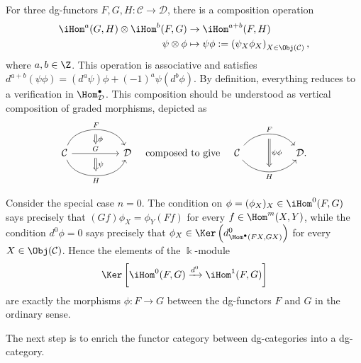 For three dg-functors $F,G,H:\mathcal{C}\to\mathcal{D}$, there is a
composition operation
\begin{equation}\label{eqn:dgfct-iHom}\begin{aligned}
	\iHom^a(G, H) \otimes \iHom^b(F, G) & \to \iHom^{a+b}(F, H) \\
	\psi \otimes \phi & \mapsto \psi\phi := \left( \psi_X \phi_X \right)_{X \in \Obj(\mathcal{C})},
\end{aligned}\end{equation}
where $a,b\in\Z$. This operation is associative and satisfies
$d^{a+b}(\psi\phi)=(d^a\psi)\phi+(-1)^a\psi(d^b\phi)$. By definition,
everything reduces to a verification in $\Hom^\bullet_{\mathcal{D}}$. This
composition should be understood as vertical composition of graded
morphisms, depicted as
\[\begin{tikzcd}
	\mathcal{C}
	\arrow[bend left=70, rr, "F", ""' name=U]
	\arrow[rr, "G" name=MM, ""' name=M]
	\arrow[bend right=70, rr, "" name=D, "H"'] & &
	\arrow[Rightarrow, to path=(U) -- (MM) \tikztonodes, "\phi"] \arrow[Rightarrow, to path=(M) -- (D) \tikztonodes, "\psi"] \mathcal{D}
\end{tikzcd}  \quad \text{composed to give} \quad \begin{tikzcd}
	\mathcal{C}
	\arrow[bend left=50, rr, "F", ""' name=U]
	\arrow[bend right=50, rr, "" name=D, "H"']
	& & \arrow[Rightarrow, to path=(U) -- (D) \tikztonodes, "\psi \phi"] \mathcal{D} .
\end{tikzcd}\]

Consider the special case $n=0$. The condition on
$\phi=(\phi_X)_X\in\iHom^0(F,G)$ says precisely that
$(Gf)\phi_X=\phi_Y(Ff)$ for every $f\in\Hom^m(X,Y)$, while the condition
$d^0\phi=0$ says precisely that
$\phi_X\in\Ker\left(d^0_{\Hom^\bullet(FX,GX)}\right)$ for every
$X\in\Obj(\mathcal{C})$. Hence the elements of the $\Bbbk$-module
\[ \Ker\left[ \iHom^0(F, G) \xrightarrow{d^0} \iHom^1(F, G) \right] \]
are exactly the morphisms $\phi:F\to G$ between the dg-functors $F$ and $G$
in the ordinary sense.

The next step is to enrich the functor category between dg-categories into a
dg-category.


